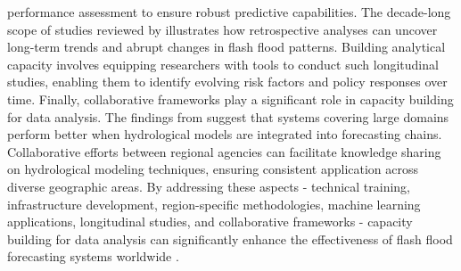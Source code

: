 performance assessment to ensure robust predictive capabilities. The decade-long scope of studies reviewed by \citep{Saad2024} illustrates how retrospective analyses can uncover long-term trends and abrupt changes in flash flood patterns. Building analytical capacity involves equipping researchers with tools to conduct such longitudinal studies, enabling them to identify evolving risk factors and policy responses over time. Finally, collaborative frameworks play a significant role in capacity building for data analysis. The findings from \citep{Zanchetta2020} suggest that systems covering large domains perform better when hydrological models are integrated into forecasting chains. Collaborative efforts between regional agencies can facilitate knowledge sharing on hydrological modeling techniques, ensuring consistent application across diverse geographic areas. By addressing these aspects - technical training, infrastructure development, region-specific methodologies, machine learning applications, longitudinal studies, and collaborative frameworks - capacity building for data analysis can significantly enhance the effectiveness of flash flood forecasting systems worldwide \citep{AlRawas2024}\citep{Laudan2020}\citep{Ngo2018}\citep{Jubach2016}.

